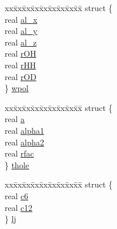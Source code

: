 \begin{DoxyCompactItemize}
\begin{tabbing}
\end{tabbing}\item 
\begin{tabbing}
xx\=xx\=xx\=xx\=xx\=xx\=xx\=xx\=xx\=\kill
struct \{\\
\>real \hyperlink{uniont__iparams_a566ef51c174fb6c3b0872654947bdde1}{al\_x}\\
\>real \hyperlink{uniont__iparams_aefc952edd1a976509d356fdfae8bf06a}{al\_y}\\
\>real \hyperlink{uniont__iparams_a73614f5abd375b70a86d6494d1df4a81}{al\_z}\\
\>real \hyperlink{uniont__iparams_aef7ea02512092933a2c0ea4e23022e9b}{rOH}\\
\>real \hyperlink{uniont__iparams_a507b7c915174e9824702ae722f678c98}{rHH}\\
\>real \hyperlink{uniont__iparams_ad88209b30440d8f970e9356b9534be80}{rOD}\\
\} \hyperlink{uniont__iparams_ada233546717982f06db151ef23af7666}{wpol}\\

\end{tabbing}\item 
\begin{tabbing}
xx\=xx\=xx\=xx\=xx\=xx\=xx\=xx\=xx\=\kill
struct \{\\
\>real \hyperlink{uniont__iparams_a070fd67041cc597a6c1ec5efeee18969}{a}\\
\>real \hyperlink{uniont__iparams_a4a17aad446da736ce31b69de32ec45ee}{alpha1}\\
\>real \hyperlink{uniont__iparams_a97862f1feb358ba5895a61cebf5a8063}{alpha2}\\
\>real \hyperlink{uniont__iparams_ab19837224898593491ecd78738cfe523}{rfac}\\
\} \hyperlink{uniont__iparams_aa8eacd8a631034ecd1a518d7bbda60af}{thole}\\

\end{tabbing}\item 
\begin{tabbing}
xx\=xx\=xx\=xx\=xx\=xx\=xx\=xx\=xx\=\kill
struct \{\\
\>real \hyperlink{uniont__iparams_ae0a64b8b583399113b65d1c5ec18a4fc}{c6}\\
\>real \hyperlink{uniont__iparams_a002c6e10a70be28bfb67d6c8e8d5c426}{c12}\\
\} \hyperlink{uniont__iparams_a547c0fa57172d201e1ca165dcd20bc01}{lj}\\


\end{tabbing}
\end{DoxyCompactItemize}

